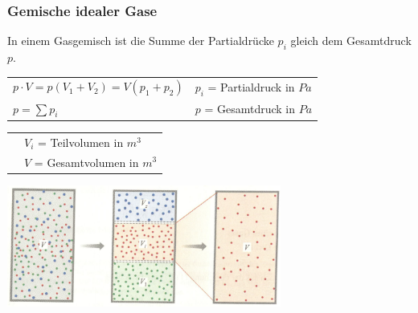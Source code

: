 		\subsubsection{Gemische idealer Gase}
			\begin{minipage}[t]{10cm}
					\begin{flushleft}
						In einem Gasgemisch ist die Summe der Partialdrücke $p_i$ gleich dem Gesamtdruck $p$.
					\end{flushleft}
					\renewcommand{\arraystretch}{2.5}
					\begin{tabular}{ p{5cm} | p{7cm}}
						$p \cdot V = p(V_1 + V_2) = V(p_1 +p_2)$	&	$p_i$ = Partialdruck in $Pa$\\
						$p = \sum p_i$	& $p$ = Gesamtdruck in $Pa$\\
					\end{tabular}
					\renewcommand{\arraystretch}{1.5}
					\begin{tabular}{ p{5cm} | p{7cm}}
						& $V_i$ = Teilvolumen in $m^3$\\
						& $V$ = Gesamtvolumen in $m^3$\\
					\end{tabular} 
					\renewcommand{\arraystretch}{1}
			\end{minipage}
			\begin{minipage}[t]{10cm}
				\vspace{-\ht\strutbox}\includegraphics[width=9cm]{./bilder/GemischIdealerGase.png}
			\end{minipage}
		
